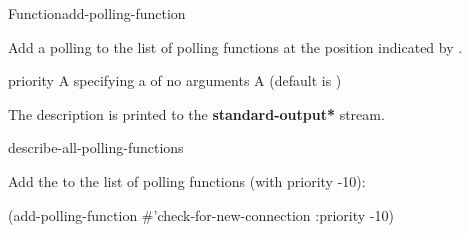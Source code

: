 \documentclass[10pt,twoside,english,pdftex]{article}
\begin{document}
\W\entities
\T\clearpage


\begin{functiondoc}{Function}{add-polling-function}%
  { 
    }
%

\fnsyntax 

\fnpurpose Add a polling  to the list of polling functions at
the position indicated by .

\fnpackage {}

\fnmodule {}

\fnargs
\begin{args}{priority}
\arg[function] A  specifying a 
  of no arguments
\arg[priority] A  (default is )
\end{args}

\fndescription
{}%
The description is printed to the {\bf *standard-output*} stream.

\begin{alsos}{describe-all-polling-functions}
\end{alsos}

\fnexample Add the   to
the list of polling functions (with priority -10):
%
\W\supp
\begin{example}
  (add-polling-function #'check-for-new-connection
     :priority -10)
\end{example}

\end{functiondoc}

\end{document}
